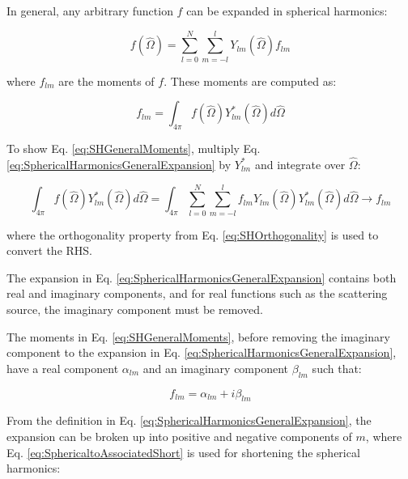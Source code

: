 \documentclass[10pt]{article}
\begin{document}
\begin{flushleft}
In general, any arbitrary function \(f\) can be expanded in spherical harmonics:

\begin{equation}
\label{eq:SphericalHarmonicsGeneralExpansion}
f(\hat{\Omega})=\sum_{l=0}^{N}\sum_{m=-l}^{l}Y_{lm}(\hat{\Omega})f_{lm}
\end{equation}

where \(f_{lm}\) are the moments of \(f\). These moments are computed as:

\begin{equation}
\label{eq:SHGeneralMoments}
f_{lm}=\int_{4\pi}^{}f(\hat{\Omega})Y_{lm}^{*}(\hat{\Omega})d\hat{\Omega}
\end{equation}

\begin{tcolorbox}[breakable]
To show Eq. \eqref{eq:SHGeneralMoments}, multiply Eq. \eqref{eq:SphericalHarmonicsGeneralExpansion} by \(Y_{lm}^{*}\) and integrate over \(\hat{\Omega}\):

\begin{equation}
\int_{4\pi}^{}f(\hat{\Omega})Y_{lm}^{*}(\hat{\Omega})d\hat{\Omega}=\int_{4\pi}^{}\sum_{l=0}^{N}\sum_{m=-l}^{l}f_{lm}Y_{lm}(\hat{\Omega})Y_{lm}^{*}(\hat{\Omega})d\hat{\Omega}\rightarrow f_{lm}
\end{equation}

where the orthogonality property from Eq. \eqref{eq:SHOrthogonality} is used to convert the RHS.
\end{tcolorbox}

The expansion in Eq. \eqref{eq:SphericalHarmonicsGeneralExpansion} contains both real and imaginary components, and for real functions such as the scattering source, the imaginary component must be removed. 

\begin{tcolorbox}[breakable]
The moments in Eq. \eqref{eq:SHGeneralMoments}, before removing the imaginary component to the expansion in Eq. \eqref{eq:SphericalHarmonicsGeneralExpansion}, have a real component \(\alpha_{lm}\) and an imaginary component \(\beta_{lm}\) such that:

\begin{equation}
\label{eq:GeneralComplexNumber}
f_{lm}=\alpha_{lm}+i\beta_{lm}
\end{equation}

From the definition in Eq. \eqref{eq:SphericalHarmonicsGeneralExpansion}, the expansion can be broken up into positive and negative components of \(m\), where Eq. \eqref{eq:SphericaltoAssociatedShort} is used for shortening the spherical harmonics:


\end{tcolorbox}
\end{flushleft}
\end{document}
